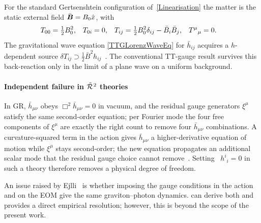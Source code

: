 For the standard Gertsenshtein configuration of~\cref{Linearisation} the
matter is the static external field $\bar{\boldsymbol{B}}=B_0\hat{x}$,
with
\begin{align*}
  T_{00} &= \tfrac{1}{2}B_0^{2} , &
  T_{0i} &= 0 , &
  T_{ij} &= \tfrac{1}{2}B_0^{2}\delta_{ij}
           - \bar{B}_{i}\bar{B}_{j} , &
  T^{\mu}{}_{\mu} &= 0 .
\end{align*}
The gravitational wave equation
\cref{TTGLorenzWaveEq} for $\bar{h}_{ij}$ acquires a
$h$-dependent source $\delta T_{ij}\supset\tfrac{1}{2}\bar{B}^{2}
h_{ij}$~\cite[eq. (13)]{hwangnoh2023graviton}.
The conventional TT-gauge
result survives this back-reaction only in the limit of a
plane wave on a uniform background.

\paragraph*{Independent failure in $\MAGFt{}^{2}$ theories}
In GR, $\bar{h}_{\mu\nu}$ obeys $\Box^{2}\bar{h}_{\mu\nu}=0$ in vacuum, and the residual
gauge generators $\xi^{\mu}$ satisfy the same second-order equation;
per Fourier mode the four free components of $\xi^{\mu}$ are exactly
the right count to remove four $\bar{h}_{\mu\nu}$ combinations.
A curvature-squared term in the action gives $\bar{h}_{\mu\nu}$ a
higher-derivative equation of motion while $\xi^{\mu}$ stays
second-order; the new equation propagates an additional scalar mode
that the residual gauge choice cannot
remove~\cite{sotiriou2010fr,sezgin1980ghostfree,lin2019pgt}.
Setting \eg~$h^{i}{}_{i}=0$ in such a theory therefore removes a
physical degree of freedom.

An issue raised by
Ejlli~\cite[footnote on p.~2]{ejlli2020graviton} is whether imposing
the gauge conditions in the action and on the EOM give
the same graviton--photon dynamics.
\TIDAL{} can derive both and provides a direct empirical resolution;
however, this is beyond the scope of the present work.
